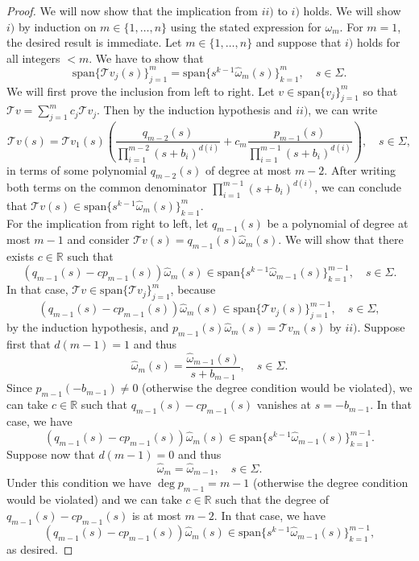 \documentclass[10pt,a4paper]{amsart}
\newcommand{\R}{\mathbb{R}}
\newcommand{\T}[1]{\mathcal{T}#1}
\newcommand{\om}{\omega}
\newcommand{\spn}[1]{\text{span}\{#1\}}
\begin{document}
\begin{proof}
    We will now show that the implication from $ii)$ to $i)$ holds. We will show $i)$ by induction on $m\in\{1,\dots,n\}$ using the stated expression for $\om_m$. For $m=1$, the desired result is immediate. Let $m\in\{1,\dots,n\}$ and suppose that $i)$ holds for all integers $<m$. We have to show that
        $$\spn{\T{v_j}(s)}_{j=1}^{m} = \spn{ s^{k-1} \hat{\om}_m(s)}_{k=1}^{m},\quad s\in\Sigma.$$
    We will first prove the inclusion from left to right. Let $v\in\spn{v_j}_{j=1}^m$ so that $ \T{v} = \sum_{j=1}^m c_j \T{v}_j $. Then by the induction hypothesis and $ii)$, we can write
        $$ \T{v}(s) = \T{v_1}(s) \left( \frac{q_{m-2}(s)}{\prod_{i=1}^{m-2} (s+b_i)^{d(i)}} + c_m \frac{p_{m-1}(s)}{\prod_{i=1}^{m-1} (s+b_i)^{d(i)}}\right),\quad s\in\Sigma, $$
    in terms of some polynomial $q_{m-2}(s)$ of degree at most $m-2$. After writing both terms on the common denominator $\prod_{i=1}^{m-1} (s+b_i)^{d(i)}$, we can conclude that $\T{v}(s)\in\spn{s^{k-1}\hat{\om}_m(s)}_{k=1}^m$. \\    
    For the implication from right to left, let $q_{m-1}(s)$ be a polynomial of degree at most $m-1$ and consider $\T{v}(s) = q_{m-1}(s) \hat{\om}_m(s)$. We will show that there exists $c\in\R$ such that 
    $$(q_{m-1}(s)-cp_{m-1}(s))\hat{\om}_m(s) \in\spn{s^{k-1}\hat{\om}_{m-1}(s)}_{k=1}^{m-1},\quad s\in\Sigma.$$ 
    In that case, $\T{v} \in\spn{\T{v_j}}_{j=1}^{m}$, because  
    $$(q_{m-1}(s)-cp_{m-1}(s))\hat{\om}_m(s)\in \spn{\T{v_j}(s)}_{j=1}^{m-1},\quad s\in\Sigma,$$
    by the induction hypothesis, and $ p_{m-1}(s)\hat{\om}_m(s) = \T{v_m}(s) $ by $ii)$. Suppose first that $d(m-1)=1$ and thus 
    $$\hat{\om}_m(s)=\frac{\hat{\om}_{m-1}(s)}{s+b_{m-1}},\quad s\in\Sigma.$$
    Since $p_{m-1}(-b_{m-1}) \neq 0$ (otherwise the degree condition would be violated), we can take $c\in\R$ such that $q_{m-1}(s)-cp_{m-1}(s)$ vanishes at $s=-b_{m-1}$. In that case, we have
    $$(q_{m-1}(s)-cp_{m-1}(s))\hat{\om}_m(s) \in\spn{s^{k-1}\hat{\om}_{m-1}(s)}_{k=1}^{m-1}.$$
    Suppose now that $d(m-1)=0$ and thus 
    $$\hat{\om}_{m}=\hat{\om}_{m-1},\quad s\in\Sigma.$$ 
    Under this condition we have $\deg p_{m-1}=m-1$ (otherwise the degree condition would be violated) and we can take $c\in\R$ such that the degree of $q_{m-1}(s)-cp_{m-1}(s)$ is at most $m-2$. In that case, we have 
    $$(q_{m-1}(s)-cp_{m-1}(s))\hat{\om}_m(s) \in\spn{s^{k-1}\hat{\om}_{m-1}(s)}_{k=1}^{m-1},$$
    as desired.
\end{proof}
\end{document}
